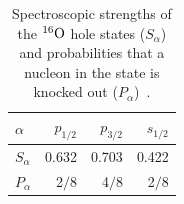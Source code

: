 \begin{table}[H]
	\centering
	\caption[Spectroscopic strengths of the $^{16}{\rm O}$ hole states and probabilities that a nucleon in the state is knocked out]{
	Spectroscopic strengths of the $^{16}{\rm O}$ hole states ($S_{\alpha}$) and probabilities that a nucleon in the state is knocked out ($P_{\alpha}$)~\cite{2012Ankowski}.
	}\label{Spec}
	\vs
	\begin{tabular}{lrrr} \hline \hline
		$\alpha$     & $p_{1/2}$ & $p_{3/2}$ & $s_{1/2}$ \\ \hline
		$S_{\alpha}$ & 0.632     & 0.703     & 0.422     \\
		$P_{\alpha}$ & 2$/$8     & 4$/$8     & 2$/$8     \\ \hline \hline
	\end{tabular}
\end{table}

